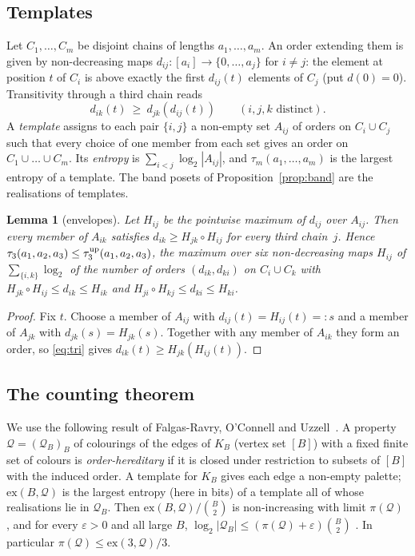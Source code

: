 \documentclass[11pt]{article}
\newtheorem{lemma}[theorem]{Lemma}
\theoremstyle{definition}
\theoremstyle{remark}
\begin{document}
\subsection*{Templates}
Let $C_1,\dots,C_m$ be disjoint chains of lengths $a_1,\dots,a_m$. An order extending them
is given by non-decreasing maps $d_{ij}\colon[a_i]\to\{0,\dots,a_j\}$ for $i\ne j$: the
element at position $t$ of $C_i$ is above exactly the first $d_{ij}(t)$ elements of $C_j$
(put $d(0)=0$). Transitivity through a third chain reads
\begin{equation}\label{eq:tri}
  d_{ik}(t)\ \ge\ d_{jk}(d_{ij}(t))\qquad(i,j,k\text{ distinct}).
\end{equation}
A \emph{template} assigns to each pair $\{i,j\}$ a non-empty set $A_{ij}$ of orders on
$C_i\cup C_j$ such that every choice of one member from each set gives an order on
$C_1\cup\dots\cup C_m$. Its \emph{entropy} is $\sum_{i<j}\log_2|A_{ij}|$, and
$\tau_m(a_1,\dots,a_m)$ is the largest entropy of a template. The band posets of
Proposition~\ref{prop:band} are the realisations of templates.

\begin{lemma}[envelopes]\label{lem:env}
Let $H_{ij}$ be the pointwise maximum of $d_{ij}$ over $A_{ij}$. Then every member of
$A_{ik}$ satisfies $d_{ik}\ge H_{jk}\circ H_{ij}$ for every third chain~$j$. Hence
$\tau_3(a_1,a_2,a_3)\le\tau_3^{\rm up}(a_1,a_2,a_3)$, the maximum over six non-decreasing
maps $H_{ij}$ of $\sum_{\{i,k\}}\log_2$ of the number of orders $(d_{ik},d_{ki})$ on
$C_i\cup C_k$ with $H_{jk}\circ H_{ij}\le d_{ik}\le H_{ik}$ and
$H_{ji}\circ H_{kj}\le d_{ki}\le H_{ki}$.
\end{lemma}
\begin{proof}
Fix $t$. Choose a member of $A_{ij}$ with $d_{ij}(t)=H_{ij}(t)=:s$ and a member of $A_{jk}$
with $d_{jk}(s)=H_{jk}(s)$. Together with any member of $A_{ik}$ they form an order, so
\eqref{eq:tri} gives $d_{ik}(t)\ge H_{jk}(H_{ij}(t))$.
\end{proof}

\subsection*{The counting theorem}
We use the following result of Falgas-Ravry, O'Connell and Uzzell~\cite{FOU}. A property
$\mathcal Q=(\mathcal Q_B)_B$ of colourings of the edges of $K_B$ (vertex set $[B]$) with a
fixed finite set of colours is \emph{order-hereditary} if it is closed under restriction to
subsets of $[B]$ with the induced order. A template for $K_B$ gives each edge a non-empty
palette; $\mathrm{ex}(B,\mathcal Q)$ is the largest entropy (here in bits) of a template all of
whose realisations lie in $\mathcal Q_B$. Then $\mathrm{ex}(B,\mathcal Q)/\binom B2$ is
non-increasing with limit $\pi(\mathcal Q)$ \cite[Prop.~2.10]{FOU}, and for every
$\varepsilon>0$ and all large $B$,
$\log_2|\mathcal Q_B|\le(\pi(\mathcal Q)+\varepsilon)\binom B2$ \cite[Cor.~2.15]{FOU}.
In particular $\pi(\mathcal Q)\le\mathrm{ex}(3,\mathcal Q)/3$.
\end{document}
